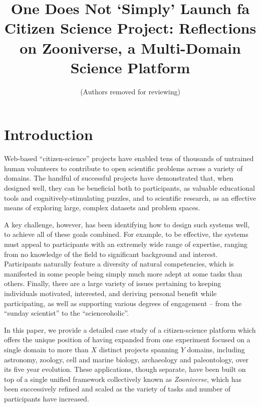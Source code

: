 \documentclass{sigchi}
\begin{document}
\title{One Does Not `Simply' Launch fa Citizen Science Project: Reflections on Zooniverse, a Multi-Domain Science Platform}

 \author{ (Authors removed for reviewing) }
\maketitle

\begin{abstract}

\end{abstract}




\section{Introduction}

Web-based ``citizen-science'' projects have enabled tens of thousands
of untrained human volunteers to contribute to open scientific
problems across a variety of domains.  The handful of successful
projects have demonstrated that, when designed well, they can be
beneficial both to participants, as valuable educational tools and
cognitively-stimulating puzzles, and to scientific research, as an
effective means of exploring large, complex datasets and problem
spaces.

A key challenge, however, has been identifying how to design such
systems well, to achieve all of these goals combined.  For example, to
be effective, the systems must appeal to participants with an
extremely wide range of expertise, ranging from no knowledge of the
field to significant background and interest.  Participants naturally
feature a diversity of natural competencies, which is manifested in
some people being simply much more adept at some tasks than
others. Finally, there are a large variety of issues pertaining to
keeping individuals motivated, interested, and deriving personal
benefit while participating, as well as supporting various degrees of
engagement -- from the ``sunday scientist'' to the ``scienceoholic''.

In this paper, we provide a detailed case study of a citizen-science
platform which offers the unique position of having expanded from one
experiment focused on a single domain to more than $X$ distinct
projects spanning $Y$ domains, including astronomy, zoology, cell and
marine biology, archaeology and paleontology, over its five year
evolution.  These applications, though separate, have been built on
top of a single unified framework collectively known as
\emph{Zooniverse}, which has been successively refined and scaled as
the variety of tasks and number of participants have increased.
\end{document}
